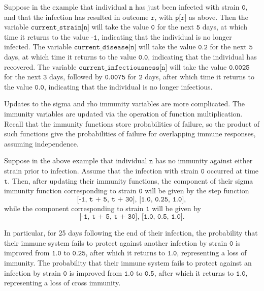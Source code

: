 \documentclass[10pt,letterpaper]{article}
\begin{document}
Suppose in the example that individual $\texttt{n}$ has just been infected with strain $\texttt{0}$, and that the infection has resulted in outcome $\texttt{r}$, with $\texttt{p[r]}$ as above. Then the variable $\texttt{current{\_}strain[n]}$ will take the value $\texttt{0}$ for the next $\texttt{5}$ days, at which time it returns to the value $\texttt{-1}$, indicating that the individual is no longer infected. The variable $\texttt{current{\_}disease[n]}$ will take the value $\texttt{0.2}$ for the next $\texttt{5}$ days, at which time it returns to the value $\texttt{0.0}$, indicating that the individual has recovered. The variable $\texttt{current{\_}infectiousness[n]}$ will take the value $\texttt{0.0025}$ for the next $\texttt{3}$ days, followed by $\texttt{0.0075}$ for $\texttt{2}$ days, after which time it returns to the value $\texttt{0.0}$, indicating that the individual is no longer infectious.

Updates to the sigma and rho immunity variables are more complicated. The immunity variables are updated via the operation of function multiplication. Recall that the immunity functions store probabilities of failure, so the product of such functions give the probabilities of failure for overlapping immune responses, assuming independence.

Suppose in the above example that individual $\texttt{n}$ has no immunity against either strain prior to infection. Assume that the infection with strain $\texttt{0}$ occurred at time $\texttt{t}$. Then, after updating their immunity functions, the component of their sigma immunity function corresponding to strain $\texttt{0}$ will be given by the step function $$\texttt{[-1, t + 5, t + 30], [1.0, 0.25, 1.0]},$$ while the component corresponding to strain $\texttt{1}$ will be given by $$\texttt{[-1, t + 5, t + 30], [1.0, 0.5, 1.0]}.$$

In particular, for 25 days following the end of their infection, the probability that their immune system fails to protect against another infection by strain $\texttt{0}$ is improved from $\texttt{1.0}$ to $\texttt{0.25}$, after which it returns to $\texttt{1.0}$, representing a loss of immunity. The probability that their immune system fails to protect against an infection by strain $\texttt{0}$ is improved from $\texttt{1.0}$ to $\texttt{0.5}$, after which it returns to $\texttt{1.0}$, representing a loss of cross immunity.
\end{document}
